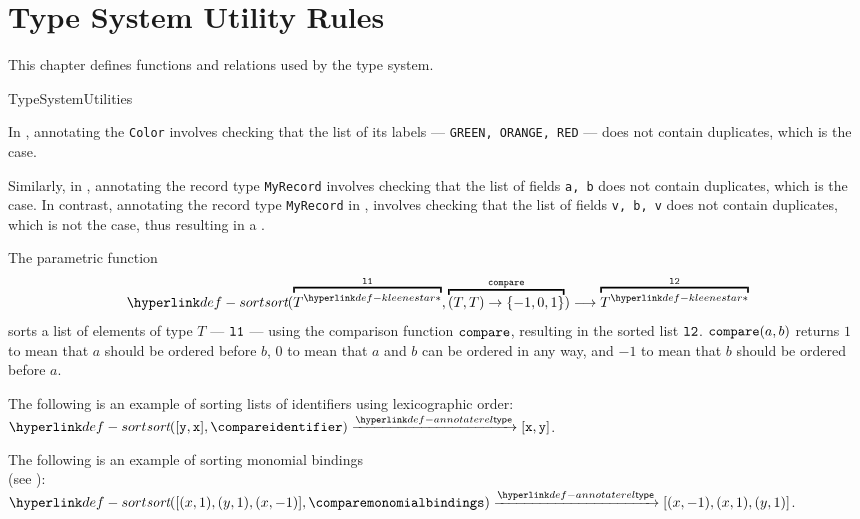 \chapter{Type System Utility Rules\label{chap:TypeSystemUtilityRules}}

This chapter defines functions and relations used by the type system.

\begin{TypingRuleList}{TypeSystemUtilities}


In , annotating the \enumerationtypeterm{} \verb|Color|
involves checking that the list of its labels --- \verb|GREEN, ORANGE, RED| --- does not contain duplicates,
which is the case.

Similarly, in , annotating the record type \verb|MyRecord|
involves checking that the list of fields \verb|a, b| does not contain duplicates, which is the case.
In contrast, annotating the record type \verb|MyRecord| in ,
involves checking that the list of fields \verb|v, b, v| does not contain duplicates, which is not the case,
thus resulting in a \typingerrorterm.



\hypertarget{def-sort}{}
The parametric function
\[
\sort(\overname{\KleeneStar{T}}{\vlone}, \overname{(T, T)\rightarrow \{-1,0,1\}}{\compare}) \aslto \overname{\KleeneStar{T}}{\vltwo}
\]
sorts a list of elements of type $T$ --- $\texttt{l1}$ --- using the comparison function $\texttt{compare}$,
resulting in the sorted list $\texttt{l2}$.
$\texttt{compare}(a, b)$ returns $1$ to mean that $a$ should be ordered before $b$,
$0$ to mean that $a$ and $b$ can be ordered in any way,
and $-1$ to mean that $b$ should be ordered before $a$.

The following is an example of sorting lists of identifiers using lexicographic order:\\
$\sort([\vy, \vx], \compareidentifier) \typearrow [\vx, \vy]$.

The following is an example of sorting monomial bindings\\
(see ):\\
$\sort([(x, 1), (y, 1), (x, -1)], \comparemonomialbindings) \typearrow [(x, -1), (x, 1), (y, 1)]$.


\end{TypingRuleList}
